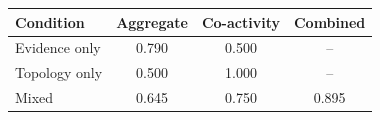 \begin{tabular}{lccc}
\toprule
Condition & Aggregate & Co-activity & Combined \\
\midrule
Evidence only & 0.790 & 0.500 & -- \\
Topology only & 0.500 & 1.000 & -- \\
Mixed & 0.645 & 0.750 & 0.895 \\
\bottomrule
\end{tabular}
